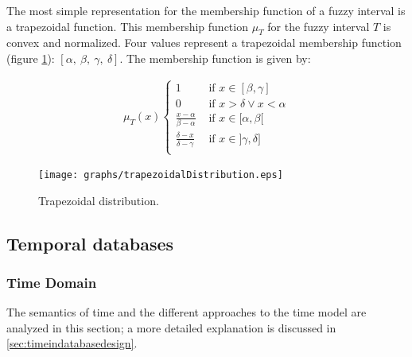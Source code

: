 The most simple representation for the membership function of a fuzzy interval is a trapezoidal function. This membership function $\mu_T$ for the fuzzy interval $T$ is convex and normalized. Four values represent a trapezoidal membership function (figure  \ref{fig:trapezoidal}): $\left[\alpha,\ \beta,\ \gamma,\ \delta\right]$. The membership function is given by:

\begin{align}
\mu_T(x)
\begin{cases}
1 & \mbox{ if } x \in [\beta,\gamma] \\
0 & \mbox{ if } x > \delta \vee x < \alpha \\
\frac{x-\alpha}{\beta - \alpha} & \mbox{ if } x \in [\alpha,\beta[ \\
\frac{\delta -x}{\delta - \gamma} & \mbox{ if } x \in ]\gamma,\delta] \\
\end{cases}
\end{align}

\begin{figure}[h!]
  \centering
  \texttt{[image: graphs/trapezoidalDistribution.eps]}
  \caption{Trapezoidal distribution.}
  \label{fig:trapezoidal}
\end{figure}






\subsection{\label{subsec:temporal}Temporal databases}

\subsubsection{\label{subsubsec:timeDomain}Time Domain}
The semantics of time and the different approaches to the time model are analyzed in this section; a more detailed explanation is discussed in \ref{sec:timeindatabasedesign}.

